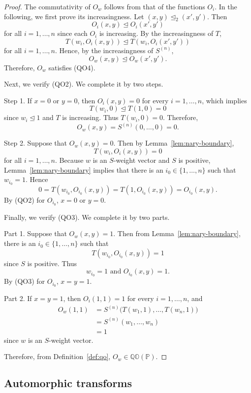 \documentclass[preprint,12pt]{elsarticle}
\begin{document}
\begin{proof}
The commutativity of $O_w$ follows from that of the functions $O_i$. In the following, we first prove its increasingness. Let $(x,y)\trianglelefteq_2(x',y')$. Then
$$
 O_i(x,y)\trianglelefteq O_i(x',y')
$$ for all $i=1,\ldots,n$ since each $O_i$ is increasing.
By the increasingness of $T$,
$$
 T(w_i,O_i(x,y))\trianglelefteq T(w_i,O_i(x',y'))
 $$for all $i=1,\ldots,n$.
Hence, by the increasingness of $S^{(n)}$,
$$
 O_w(x,y)\trianglelefteq O_w(x',y').
$$
Therefore, $O_w$ satisfies (QO4).

Next, we verify (QO2). We complete it by two steps.

Step 1. If $x=0$ or $y=0$, then $O_i(x,y)=0$ for every $i=1,\ldots,n$, which implies
$$
 T(w_i,0)\trianglelefteq T(1,0)=0
$$since $w_i\trianglelefteq1$ and $T$ is increasing.
Thus $T(w_i,0)=0$. Therefore,
$$
 O_w(x,y)=S^{(n)}(0,\ldots,0)=0.
$$

Step 2. Suppose that $O_w(x,y)=0$. Then by Lemma~\ref{lem:nary-boundary},
$$
 T(w_i,O_i(x,y))=0
$$for all $i=1,\ldots,n$.
Because $w$ is an $S$-weight vector and $S$ is positive, Lemma~\ref{lem:nary-boundary} implies that there is an $i_0\in\{1,\ldots,n\}$ such that $w_{i_0}=1$. Hence
$$
 0=T(w_{i_0},O_{i_0}(x,y))
  =T(1,O_{i_0}(x,y))
  =O_{i_0}(x,y).
$$
By (QO2) for $O_{i_0}$, $x=0$ or $y=0$.

Finally, we verify (QO3). We complete it by two parts.

Part 1. Suppose that $O_w(x,y)=1$. Then from Lemma~\ref{lem:nary-boundary}, there is an $i_0\in\{1,\ldots,n\}$ such that
$$
 T(w_{i_0},O_{i_0}(x,y))=1
$$ since $S$ is positive.
Thus
$$
 w_{i_0}=1\mbox{ and }O_{i_0}(x,y)=1.
$$
By (QO3) for $O_{i_0}$, $x=y=1$.

Part 2. If $x=y=1$, then $O_i(1,1)=1$ for every $i=1,\ldots,n$, and
$$
\begin{aligned}
O_w(1,1)
&=S^{(n)}\bigl(T(w_1,1),\ldots,T(w_n,1)\bigr)\\
&=S^{(n)}(w_1,\ldots,w_n)\\
&=1
\end{aligned}
$$ since $w$ is an $S$-weight vector.

Therefore, from Definition~\ref{def:qo}, $O_w\in\mathbb{QO}(\mathbb{P})$.
\end{proof}

\subsection{Automorphic transforms}
\end{document}
